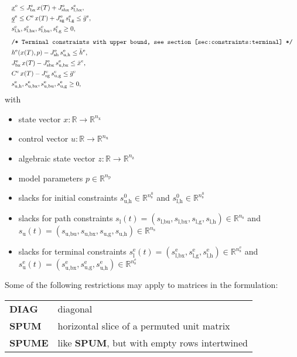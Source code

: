 \documentclass[english]{article}
\newcommand{\ind}[1]{_{\textrm{#1}}}
\newcommand{\terminal}{^{\textrm{e}}}
\newcommand{\initial}{^{\textrm{0}}}
\newcommand{\Lower}{\ind{l}}
\newcommand{\lowerh}{\ind{l,h}}
\newcommand{\lowerbx}{\ind{l,bx}}
\newcommand{\lowerbu}{\ind{l,bu}}
\newcommand{\lowerg}{\ind{l,g}}
\newcommand{\upper}{\ind{u}}
\newcommand{\upperh}{\ind{u,h}}
\newcommand{\upperbx}{\ind{u,bx}}
\newcommand{\upperbu}{\ind{u,bu}}
\newcommand{\upperg}{\ind{u,g}}
\newcommand{\mathComment}[1]{\texttt{/* #1 */}}
\newcommand{\R}{\mathbb{R}}
\newcommand{\nx}{n\ind{x}}
\newcommand{\nuu}{n\ind{u}}
\newcommand{\nz}{n\ind{z}}
\newcommand{\np}{n\ind{p}}
\newcommand{\ns}{n\ind{s}}
\begin{document}
\begin{align}
    &&&\underline{x}\terminal \leq J_{\textrm{bx}}\terminal\, x(T) + J\ind{sbx}\terminal\, s\lowerbx\terminal, &&\\ %
    &&&\underline{g}\terminal \leq C\terminal\, x(T) + J\ind{sg}\terminal\, s\lowerg\terminal \leq \bar{g}\terminal, && \\
    &&& s\lowerh\terminal, s\lowerbx\terminal, s\lowerbu\terminal, s\lowerg\terminal \geq 0, \label{eq:constraints:terminal:lower_bounds:end}\\[1ex]
    &&&\mathComment{Terminal constraints with upper bound, see section \ref{sec:constraints:terminal}}\nonumber\\
    &&& h\terminal(x(T), p) - J\ind{sh}\terminal\, s\ind{u,h}\terminal \leq \bar{h}\terminal, &&\label{eq:constraints:terminal:upper_bounds:start}\\
    &&& J_{\textrm{bx}}\terminal\, x(T) - J\ind{sbx}\terminal\, s\ind{u,bx}\terminal \leq \bar{x}^{e}, &&\\ %
    &&& C\terminal\, x(T) - J\ind{sg}\terminal\, s\ind{u,g}\terminal \leq \bar{g}\terminal \\
    &&& s\upperh\terminal, s\upperbx\terminal, s\upperbu\terminal, s\upperg\terminal \geq 0,\label{eq:constraints:terminal:upper_bounds:end}
\end{align}
%
with
\begin{itemize}
\item state vector $ x: \R \rightarrow \R^{\nx} $
\item control vector $ u: \R \rightarrow \R^{\nuu} $
\item algebraic state vector $ z: \R \rightarrow \R^{\nz} $
\item model parameters $ p \in \R^{\np} $
\item slacks for initial constraints $s\ind{u,h}\initial \in \R^{\ns\initial}$ and $s\ind{l,h}\initial \in \R^{\ns\initial}$
\item slacks for path constraints $ s\Lower(t) = (s\lowerbu, s\lowerbx, s\lowerg, s\lowerh) \in \R^{\ns} $ and $ s\upper(t) = (s\upperbu, s\upperbx, s\upperg, s\upperh) \in \R^{\ns} $
\item slacks for terminal constraints $ s\Lower\terminal(t) = (s\lowerbx\terminal, s\lowerg\terminal, s\lowerh\terminal) \in \R^{\ns\terminal} $ and $ s\upper\terminal(t) = (s\upperbx\terminal, s\upperg\terminal, s\upperh\terminal) \in \R^{\ns\terminal} $
\end{itemize}
%
Some of the following restrictions may apply to matrices in the formulation:
\begin{center}
    \begin{tabular}{ll}
        \textbf{DIAG} & diagonal\\
        \textbf{SPUM} & horizontal slice of a permuted unit matrix\\
        \textbf{SPUME} & like \textbf{SPUM}, but with empty rows intertwined
    \end{tabular}
\end{center}
%
\end{document}
